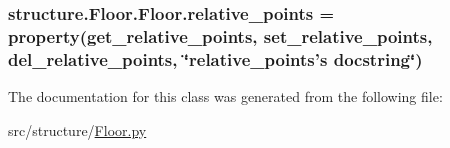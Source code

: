 \hypertarget{classstructure_1_1_floor_1_1_floor_a07b4e6babefcdc1c5e2463c09f1a5ed1}{
\subsubsection[{relative\-\_\-points}]{\setlength{\rightskip}{0pt plus 5cm}structure.\-Floor.\-Floor.\-relative\-\_\-points = property({\bf get\-\_\-relative\-\_\-points}, {\bf set\-\_\-relative\-\_\-points}, {\bf del\-\_\-relative\-\_\-points}, \char`\"{}relative\-\_\-points's docstring\char`\"{})\hspace{0.3cm}{\ttfamily [static]}}}\label{classstructure_1_1_floor_1_1_floor_a07b4e6babefcdc1c5e2463c09f1a5ed1}


The documentation for this class was generated from the following file\-:\begin{DoxyCompactItemize}
\item 
src/structure/\hyperlink{_floor_8py}{Floor.\-py}\end{DoxyCompactItemize}
